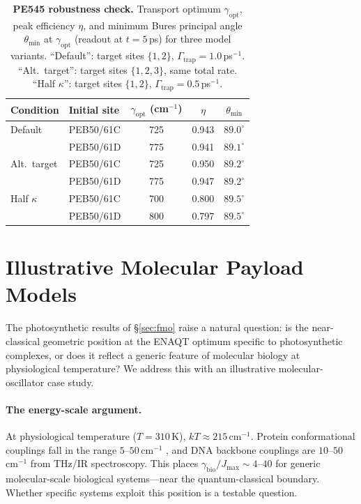 \documentclass[12pt,a4paper]{article}
\theoremstyle{definition}
\theoremstyle{remark}
\begin{document}
\begin{table}[H]
\centering
\caption{\textbf{PE545 robustness check.} Transport optimum $\gamma_{\mathrm{opt}}$, peak efficiency $\eta$, and minimum Bures principal angle $\theta_{\min}$ at $\gamma_{\mathrm{opt}}$ (readout at $t = 5$\,ps) for three model variants. ``Default'': target sites $\{1,2\}$, $\Gamma_{\mathrm{trap}} = 1.0$\,ps$^{-1}$. ``Alt.\ target'': target sites $\{1,2,3\}$, same total rate. ``Half $\kappa$'': target sites $\{1,2\}$, $\Gamma_{\mathrm{trap}} = 0.5$\,ps$^{-1}$.}
\label{tab:pe545-robustness}
\smallskip
\begin{tabular}{llccc}
\hline
Condition & Initial site & $\gamma_{\mathrm{opt}}$ (cm$^{-1}$) & $\eta$ & $\theta_{\min}$ \\
\hline
Default       & PEB50/61C & 725 & 0.943 & $89.0^\circ$ \\
              & PEB50/61D & 775 & 0.941 & $89.1^\circ$ \\[3pt]
Alt.\ target  & PEB50/61C & 725 & 0.950 & $89.2^\circ$ \\
              & PEB50/61D & 775 & 0.947 & $89.2^\circ$ \\[3pt]
Half $\kappa$ & PEB50/61C & 700 & 0.800 & $89.5^\circ$ \\
              & PEB50/61D & 800 & 0.797 & $89.5^\circ$ \\
\hline
\end{tabular}
\end{table}

\section{Illustrative Molecular Payload Models}
\label{app:chromatin}

The photosynthetic results of \S\ref{sec:fmo} raise a natural question: is the near-classical geometric position at the ENAQT optimum specific to photosynthetic complexes, or does it reflect a generic feature of molecular biology at physiological temperature? We address this with an illustrative molecular-oscillator case study.

\paragraph{The energy-scale argument.}
At physiological temperature ($T = 310$\,K), $kT \approx 215$\,cm$^{-1}$. Protein conformational couplings fall in the range $5$--$50$\,cm$^{-1}$ \cite{clapier2009chromatin}, and DNA backbone couplings are $10$--$50$\,cm$^{-1}$ from THz/IR spectroscopy. This places $\gamma_{\mathrm{bio}}/J_{\max} \sim 4$--$40$ for generic molecular-scale biological systems---near the quantum-classical boundary. Whether specific systems exploit this position is a testable question.
\end{document}
